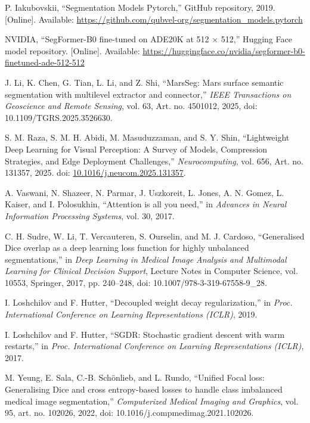 P. Iakubovskii,
``Segmentation Models Pytorch,''
GitHub repository, 2019.
    [Online]. Available:
\url{https://github.com/qubvel-org/segmentation_models.pytorch}

NVIDIA,
``SegFormer-B0 fine-tuned on ADE20K at 512 \(\times\) 512,''
Hugging Face model repository.
    [Online]. Available:
\url{https://huggingface.co/nvidia/segformer-b0-finetuned-ade-512-512}

J. Li, K. Chen, G. Tian, L. Li, and Z. Shi,
``MarsSeg: Mars surface semantic segmentation with multilevel
extractor and connector,''
\emph{IEEE Transactions on Geoscience and Remote Sensing},
vol. 63, Art. no. 4501012, 2025,
doi: 10.1109/TGRS.2025.3526630.

S. M. Raza, S. M. H. Abidi, M. Masuduzzaman, and S. Y. Shin,
``Lightweight Deep Learning for Visual Perception: A Survey of Models,
Compression Strategies, and Edge Deployment Challenges,''
\emph{Neurocomputing}, vol. 656, Art. no. 131357, 2025.
doi: \href{https://doi.org/10.1016/j.neucom.2025.131357}
{10.1016/j.neucom.2025.131357}.

A. Vaswani, N. Shazeer, N. Parmar, J. Uszkoreit, L. Jones,
A. N. Gomez, L. Kaiser, and I. Polosukhin,
``Attention is all you need,''
in \emph{Advances in Neural Information Processing Systems},
vol. 30, 2017.

C. H. Sudre, W. Li, T. Vercauteren, S. Ourselin, and M. J. Cardoso,
``Generalised Dice overlap as a deep learning loss function for highly
unbalanced segmentations,''
in \emph{Deep Learning in Medical Image Analysis and Multimodal Learning
    for Clinical Decision Support},
Lecture Notes in Computer Science, vol. 10553,
Springer, 2017, pp. 240--248,
doi: 10.1007/978-3-319-67558-9\_28.

I. Loshchilov and F. Hutter,
``Decoupled weight decay regularization,''
in \emph{Proc. International Conference on Learning Representations
    (ICLR)}, 2019.

I. Loshchilov and F. Hutter,
``SGDR: Stochastic gradient descent with warm restarts,''
in \emph{Proc. International Conference on Learning Representations
    (ICLR)}, 2017.

M. Yeung, E. Sala, C.-B. Sch\"onlieb, and L. Rundo,
``Unified Focal loss: Generalising Dice and cross entropy-based losses
to handle class imbalanced medical image segmentation,''
\emph{Computerized Medical Imaging and Graphics},
vol. 95, art. no. 102026, 2022,
doi: 10.1016/j.compmedimag.2021.102026.

